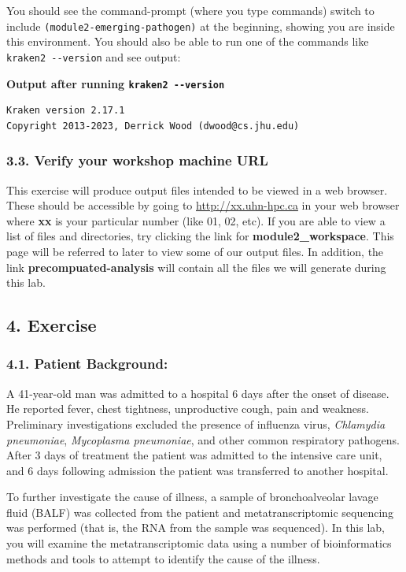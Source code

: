 \documentclass[
]{book}
\begin{document}
You should see the command-prompt (where you type commands) switch to include \texttt{(module2-emerging-pathogen)} at the beginning, showing you are inside this environment. You should also be able to run one of the commands like \texttt{kraken2\ -\/-version} and see output:

\textbf{Output after running \texttt{kraken2\ -\/-version}}

\begin{verbatim}
Kraken version 2.17.1
Copyright 2013-2023, Derrick Wood (dwood@cs.jhu.edu)
\end{verbatim}

\subsubsection{3.3. Verify your workshop machine URL}\label{verify-your-workshop-machine-url}

This exercise will produce output files intended to be viewed in a web browser. These should be accessible by going to \url{http://xx.uhn-hpc.ca} in your web browser where \textbf{xx} is your particular number (like 01, 02, etc). If you are able to view a list of files and directories, try clicking the link for \textbf{module2\_workspace}. This page will be referred to later to view some of our output files. In addition, the link \textbf{precompuated-analysis} will contain all the files we will generate during this lab.

\subsection{4. Exercise}\label{exercise}

\subsubsection{4.1. Patient Background:}\label{exercise-background}

A 41-year-old man was admitted to a hospital 6 days after the onset of disease. He reported fever, chest tightness, unproductive cough, pain and weakness. Preliminary investigations excluded the presence of influenza virus, \emph{Chlamydia pneumoniae}, \emph{Mycoplasma pneumoniae}, and other common respiratory pathogens. After 3 days of treatment the patient was admitted to the intensive care unit, and 6 days following admission the patient was transferred to another hospital.

To further investigate the cause of illness, a sample of bronchoalveolar lavage fluid (BALF) was collected from the patient and metatranscriptomic sequencing was performed (that is, the RNA from the sample was sequenced). In this lab, you will examine the metatranscriptomic data using a number of bioinformatics methods and tools to attempt to identify the cause of the illness.
\end{document}
